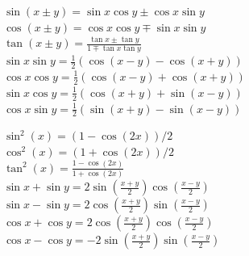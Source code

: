 \documentclass[12pt,a4paper]{article}
\renewcommand{\=}[1]{\stackrel{#1}{=}}
\theoremstyle{definition}
\theoremstyle{remark}
\begin{document}
\begin{center}
\begin{minipage}[t]{.49\linewidth}
\vspace{0pt}

\noindent$\sin(x\pm y) = \sin x \cos y \pm \cos x \sin y$\\
$\cos(x \pm y) = \cos x \cos y \mp \sin x \sin y$\\
$\tan (x \pm y) = \frac{\tan x \pm \tan y}{1 \mp \tan x \tan y}$\\

\noindent$\sin x \sin y = \frac{1}{2} (\cos (x-y) - \cos (x+y))$\\
$\cos x \cos y = \frac{1}{2} (\cos (x-y) + \cos (x+y))$\\
$\sin x \cos y = \frac{1}{2} (\cos (x+y) + \sin (x-y))$\\
$\cos x \sin y = \frac{1}{2} (\sin (x+y) - \sin (x-y))$

\end{minipage}%
\begin{minipage}[t]{.49\linewidth}
\vspace{0pt}

\noindent$\sin^2 (x) = (1 - \cos (2x))/2$\\
$\cos^2 (x) = (1 + \cos (2x))/2$\\
$\tan^2 (x) = \frac{1 - \cos (2x)}{1 + \cos (2x)}$\\

\noindent$\sin x + \sin y = 2 \sin (\frac{x+y}{2}) \cos (\frac{x-y}{2})$\\
$\sin x - \sin y = 2 \cos (\frac{x+y}{2}) \sin (\frac{x-y}{2})$\\
$\cos x + \cos y = 2 \cos (\frac{x+y}{2}) \cos (\frac{x-y}{2})$\\
$\cos x - \cos y = - 2 \sin (\frac{x+y}{2}) \sin (\frac{x-y}{2})$

\end{minipage}
\end{center}
\end{document}
